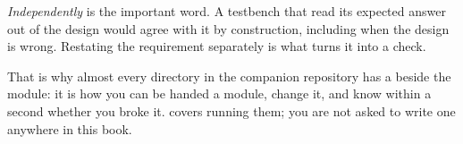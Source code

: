 \emph{Independently} is the important word. A testbench that read its expected answer out of the
design would agree with it by construction, including when the design is wrong. Restating the
requirement separately is what turns it into a check.

That is why almost every directory in the companion repository has a  beside the
module: it is how you can be handed a module, change it, and know within a second whether you broke
it.  covers running them; you are not asked to write one anywhere in this book.
